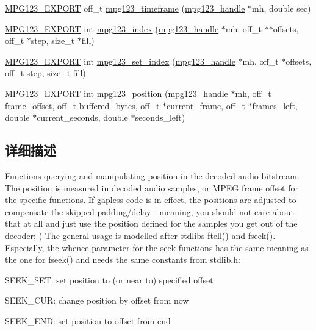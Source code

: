 \begin{DoxyCompactItemize}
\item 
\hyperlink{mpg123_8h_a2ba98cfba3f760879df70e755b2a61cc}{M\+P\+G123\+\_\+\+E\+X\+P\+O\+RT} off\+\_\+t \hyperlink{group__mpg123__seek_gab6c3b85832ef3de29aafdb0ef790043b}{mpg123\+\_\+timeframe} (\hyperlink{group__mpg123__init_ga6728e2839a395f3a07d4514da659faca}{mpg123\+\_\+handle} $\ast$mh, double sec)
\item 
\hyperlink{mpg123_8h_a2ba98cfba3f760879df70e755b2a61cc}{M\+P\+G123\+\_\+\+E\+X\+P\+O\+RT} int \hyperlink{group__mpg123__seek_gae1d174ac632ec72df7dead94c04865fb}{mpg123\+\_\+index} (\hyperlink{group__mpg123__init_ga6728e2839a395f3a07d4514da659faca}{mpg123\+\_\+handle} $\ast$mh, off\+\_\+t $\ast$$\ast$offsets, off\+\_\+t $\ast$step, size\+\_\+t $\ast$fill)
\item 
\hyperlink{mpg123_8h_a2ba98cfba3f760879df70e755b2a61cc}{M\+P\+G123\+\_\+\+E\+X\+P\+O\+RT} int \hyperlink{group__mpg123__seek_ga0e59ca79cc1e1ad984ad46186e7f0665}{mpg123\+\_\+set\+\_\+index} (\hyperlink{group__mpg123__init_ga6728e2839a395f3a07d4514da659faca}{mpg123\+\_\+handle} $\ast$mh, off\+\_\+t $\ast$offsets, off\+\_\+t step, size\+\_\+t fill)
\item 
\hyperlink{mpg123_8h_a2ba98cfba3f760879df70e755b2a61cc}{M\+P\+G123\+\_\+\+E\+X\+P\+O\+RT} int \hyperlink{group__mpg123__seek_gafafcafb33dce9a28eb5ad07eb054149a}{mpg123\+\_\+position} (\hyperlink{group__mpg123__init_ga6728e2839a395f3a07d4514da659faca}{mpg123\+\_\+handle} $\ast$mh, off\+\_\+t frame\+\_\+offset, off\+\_\+t buffered\+\_\+bytes, off\+\_\+t $\ast$current\+\_\+frame, off\+\_\+t $\ast$frames\+\_\+left, double $\ast$current\+\_\+seconds, double $\ast$seconds\+\_\+left)
\end{DoxyCompactItemize}


\subsection{详细描述}
Functions querying and manipulating position in the decoded audio bitstream. The position is measured in decoded audio samples, or M\+P\+EG frame offset for the specific functions. If gapless code is in effect, the positions are adjusted to compensate the skipped padding/delay -\/ meaning, you should not care about that at all and just use the position defined for the samples you get out of the decoder;-\/) The general usage is modelled after stdlib\textquotesingle{}s ftell() and fseek(). Especially, the whence parameter for the seek functions has the same meaning as the one for fseek() and needs the same constants from stdlib.\+h\+:
\begin{DoxyItemize}
\item S\+E\+E\+K\+\_\+\+S\+ET\+: set position to (or near to) specified offset
\item S\+E\+E\+K\+\_\+\+C\+UR\+: change position by offset from now
\item S\+E\+E\+K\+\_\+\+E\+ND\+: set position to offset from end
\end{DoxyItemize}

